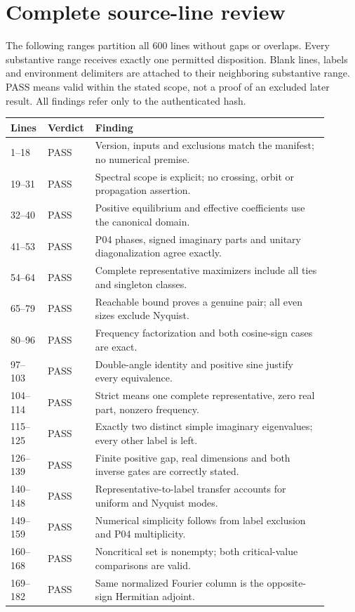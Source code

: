 \documentclass[11pt]{article}
\begin{document}
\section{Complete source-line review}
\label{sec:lines}
The following ranges partition all 600 lines without gaps or overlaps.
Every substantive range receives exactly one permitted disposition. Blank
lines, labels and environment delimiters are attached to their neighboring
substantive range. PASS means valid within the stated scope, not a proof of
an excluded later result. All findings refer only to the authenticated hash.
\begin{longtable}{p{0.10\linewidth}p{0.10\linewidth}p{0.70\linewidth}}
\toprule Lines&Verdict&Finding\\\midrule\endhead
1--18&PASS&Version, inputs and exclusions match the manifest; no numerical premise.\\
19--31&PASS&Spectral scope is explicit; no crossing, orbit or propagation assertion.\\
32--40&PASS&Positive equilibrium and effective coefficients use the canonical domain.\\
41--53&PASS&P04 phases, signed imaginary parts and unitary diagonalization agree exactly.\\
54--64&PASS&Complete representative maximizers include all ties and singleton classes.\\
65--79&PASS&Reachable bound proves a genuine pair; all even sizes exclude Nyquist.\\
80--96&PASS&Frequency factorization and both cosine-sign cases are exact.\\
97--103&PASS&Double-angle identity and positive sine justify every equivalence.\\
104--114&PASS&Strict means one complete representative, zero real part, nonzero frequency.\\
115--125&PASS&Exactly two distinct simple imaginary eigenvalues; every other label is left.\\
126--139&PASS&Finite positive gap, real dimensions and both inverse gates are correctly stated.\\
140--148&PASS&Representative-to-label transfer accounts for uniform and Nyquist modes.\\
149--159&PASS&Numerical simplicity follows from label exclusion and P04 multiplicity.\\
160--168&PASS&Noncritical set is nonempty; both critical-value comparisons are valid.\\
169--182&PASS&Same normalized Fourier column is the opposite-sign Hermitian adjoint.\\

\end{longtable}
\end{document}
